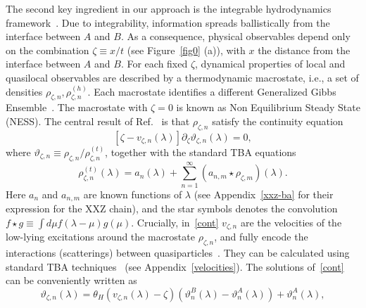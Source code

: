 \documentclass[twocolumn,superscriptaddress,prb,10pt]{revtex4-1}
\begin{document}
The second key ingredient in our approach is the integrable hydrodynamics 
framework~\cite{olalla-2016,bertini-2016}. 
Due to integrability, information spreads ballistically from the 
interface between $A$ and $B$. As a consequence, physical observables depend only 
on the combination $\zeta\equiv x/t$ (see Figure~\ref{fig0} (a)), with $x$ the distance 
from the interface between $A$ and $B$. For each fixed $\zeta$, dynamical 
properties of local and quasilocal observables are described by a thermodynamic 
macrostate, i.e., a set of densities $\rho_{\zeta,n},\rho_{\zeta,n}^{\scriptscriptstyle(h)}$. 
Each macrostate identifies a different Generalized Gibbs Ensemble~\cite{rigol-2008,polkovnikov-2011,calabrese-2005,rigol-2007,
cazalilla-2006,barthel-2008,cramer-2008,cramer-2010,calabrese-2011,cazalilla-2012a,calabrese-2012,sotiriadis-2012,
collura-2013,collura-2013a,fagotti-2013,fagotti-2014,kcc14,delfino-2014,sotiriadis-2014,ilievski-2015a,alba-2015,essler-2015,cardy-2015,
cardy-2015,sotiriadis-2016,bastianello-2016,vernier-2016,vidmar-2016,gogolin-2015,essler-2016,calabrese-2016,piroli-2017,piroli-2017a}. 
The macrostate with $\zeta=0$ is known as Non Equilibrium Steady State (NESS). 
The central result of Ref.~ is that 
$\rho_{\zeta,n}$ satisfy the continuity equation 
%
\begin{equation}
\label{cont}
[\zeta-v_{\zeta,n}(\lambda)]\partial_\zeta\vartheta_{\zeta,n}(\lambda)=0, 
\end{equation}
%
where $\vartheta_{\zeta,n}\equiv\rho_{\zeta,n}/\rho_{\zeta,n}^{\scriptscriptstyle(t)}$, 
together with the standard TBA equations~\cite{taka-book} 
%
\begin{equation}
\label{tba}
\rho^{(t)}_{\zeta,n}(\lambda)=a_n(\lambda)+\sum_{n=1}^\infty (a_{n,m}\star\rho_{\zeta,m})
(\lambda). 
\end{equation}
%
Here $a_n$ and $a_{n,m}$ are known functions of $\lambda$ (see Appendix~\ref{xxz-ba} for their 
expression for the XXZ chain), 
and the star symbols denotes the convolution $f\star g\equiv\int d\mu f(\lambda-\mu)g(\mu)$. 
Crucially, in~\eqref{cont} $v_{\zeta,n}$ are the velocities of the low-lying excitations around 
the macrostate $\rho_{\zeta,n}$, and fully encode the interactions (scatterings) between 
quasiparticles~\cite{bonnes-2014}. They can be calculated using standard TBA techniques~\cite{bonnes-2014} 
(see Appendix~\ref{velocities}). The solutions of~\eqref{cont} can be conveniently written 
as~\cite{bertini-2016} 
%
\begin{equation}
\label{sol}
\vartheta_{\zeta,n}(\lambda)=\theta_H(v_{\zeta,n}(\lambda)-\zeta)(\vartheta_n^B(\lambda)-\vartheta_n^A(\lambda))
+\vartheta^A_n(\lambda), 
\end{equation}
\end{document}
